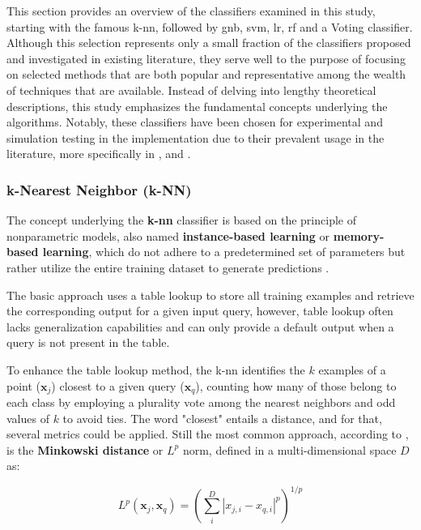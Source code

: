 This section provides an overview of the classifiers examined in this study, starting with the famous \gls{k-nn}, followed by \gls{gnb}, \gls{svm}, \gls{lr}, \gls{rf} and a Voting classifier.  Although this selection represents only a small fraction of the classifiers proposed and investigated in existing literature, they serve well to the purpose of focusing on selected methods that are both popular and representative among the wealth of techniques that are available. Instead of delving into lengthy theoretical descriptions, this study emphasizes the fundamental concepts underlying the algorithms. Notably, these classifiers have been chosen for experimental and simulation testing in the implementation due to their prevalent usage in the literature, more specifically in \textcite{Bountourakis2015}, \textcite{Silva2019} and \textcite{Lhoest2021}.


\subsubsection{k-Nearest Neighbor (k-NN)}
\label{subsubsec:machine_learning_k-NN}

The concept underlying the \textbf{\gls{k-nn}} classifier is based on the principle of nonparametric models, also named \textbf{instance-based learning} or \textbf{memory-based learning}, which do not adhere to a predetermined set of parameters but rather utilize the entire training dataset to generate predictions \cite{Russel2010}. 

The basic approach uses a table lookup to store all training examples and retrieve the corresponding output for a given input query, however, table lookup often lacks generalization capabilities and can only provide a default output when a query is not present in the table.

To enhance the table lookup method, the \gls{k-nn} identifies the $k$ examples of a point ($\mathbf{x}_j$) closest to a given query ($\mathbf{x}_q$), counting how many of those belong to each class by employing a plurality vote among the nearest neighbors and odd values of $k$ to avoid ties. The word "closest" entails a distance, and for that, several metrics could be applied. Still the most common approach, according to \textcite{Russel2010}, is the \textbf{Minkowski distance} or $L^p$ norm, defined in a multi-dimensional space $D$ as:

\begin{equation}
    \label{eq:minkowski_distance}
L^p\left(\mathbf{x}_j, \mathbf{x}_q\right)=\left(\sum_i^D\left|x_{j, i}-x_{q, i}\right|^p\right)^{1 / p}
\end{equation}

